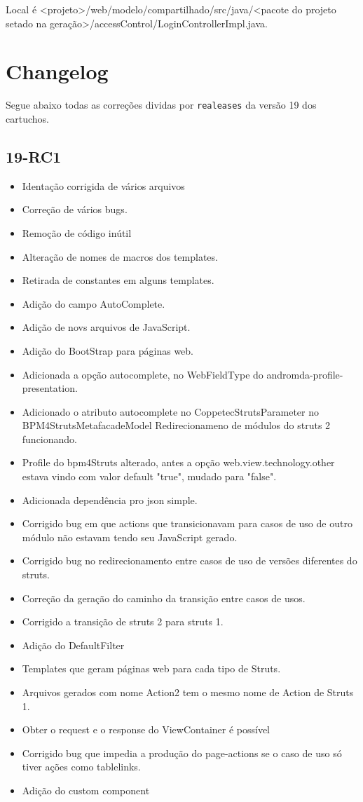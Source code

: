 Local é <projeto>/web/modelo/compartilhado/src/java/<pacote do projeto setado na
geração>/accessControl/LoginControllerImpl.java.


\chapter{Changelog}

Segue abaixo todas as correções dividas por \texttt{realeases} da versão 19 dos cartuchos.

\section{19-RC1}

\begin{itemize}
  \item Identação corrigida de vários arquivos
  \item Correção de vários bugs.
  \item Remoção de código inútil
  \item Alteração de nomes de macros dos templates.
  \item Retirada de constantes em alguns templates.
  \item Adição do campo AutoComplete.
  \item Adição de novs arquivos de JavaScript.
  \item Adição do BootStrap para páginas web.
  \item Adicionada a opção  autocomplete, no WebFieldType do
  andromda-profile-presentation.
  \item Adicionado o atributo autocomplete no CoppetecStrutsParameter no
BPM4StrutsMetafacadeModel Redirecionameno de módulos do struts 2 funcionando.
  \item Profile do bpm4Struts alterado, antes a opção web.view.technology.other
estava vindo com valor default "true", mudado para "false".
  \item Adicionada dependência pro json simple.
  \item Corrigido bug em que actions que transicionavam para casos de uso de
outro módulo não estavam tendo seu JavaScript gerado.
  \item Corrigido bug no redirecionamento entre casos de uso de versões
diferentes do struts.
  \item Correção da geração do caminho da transição entre casos de usos.
  \item Corrigido a transição de struts 2 para struts 1.
  \item Adição do DefaultFilter
  \item Templates que geram páginas web para cada tipo de Struts.
  \item Arquivos gerados com nome Action2 tem o mesmo nome de Action de Struts
1.
  \item Obter o request e o response do ViewContainer é possível
  \item Corrigido bug que impedia a produção do page-actions se o caso de uso só
tiver ações como tablelinks.
  \item Adição do custom component
\end{itemize}

